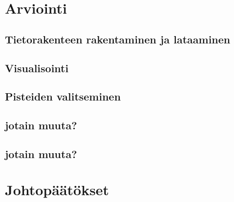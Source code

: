 \section{Arviointi}\label{arviointi}

\subsection{Tietorakenteen rakentaminen ja lataaminen}
\subsection{Visualisointi}
\subsection{Pisteiden valitseminen}
\subsection{jotain muuta?}
\subsection{jotain muuta?}



\section{Johtopäätökset}









\renewcommand{\baselinestretch}{1}\large\normalsize



\clearpage

%
%
%
%
%
%
%
